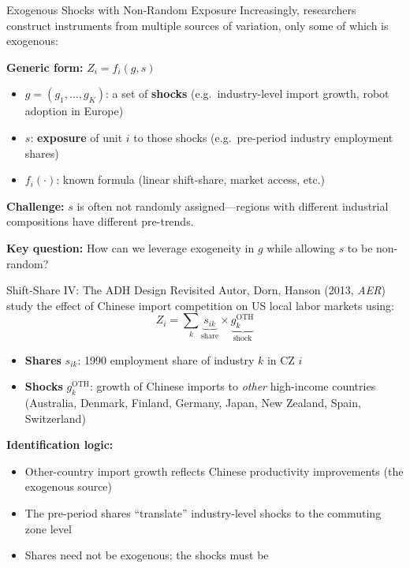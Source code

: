 \documentclass{beamer}
\begin{document}
\begin{frame}{Exogenous Shocks with Non-Random Exposure}
Increasingly, researchers construct instruments from multiple sources of
variation, only some of which is exogenous:

\medskip
\textbf{Generic form:} $Z_i = f_i(g,s)$
\begin{itemize}
  \item $g=(g_1,\ldots,g_K)$: a set of \textbf{shocks} (e.g.\ industry-level
        import growth, robot adoption in Europe)
  \item $s$: \textbf{exposure} of unit $i$ to those shocks
        (e.g.\ pre-period industry employment shares)
  \item $f_i(\cdot)$: known formula (linear shift-share, market access, etc.)
\end{itemize}

\medskip
\textbf{Challenge:} $s$ is often not randomly assigned---regions with
different industrial compositions have different pre-trends.

\medskip
\textbf{Key question:} How can we leverage exogeneity in $g$ while
allowing $s$ to be non-random?
\end{frame}

\begin{frame}{Shift-Share IV: The ADH Design Revisited}
Autor, Dorn, Hanson (2013, \emph{AER}) study the effect of Chinese import
competition on US local labor markets using:
\[
Z_i = \sum_k \underbrace{s_{ik}}_{\text{share}} \times
             \underbrace{g_k^{\text{OTH}}}_{\text{shock}}
\]
\begin{itemize}
  \item \textbf{Shares} $s_{ik}$: 1990 employment share of industry $k$ in CZ $i$
  \item \textbf{Shocks} $g_k^{\text{OTH}}$: growth of Chinese imports to
        \emph{other} high-income countries (Australia, Denmark, Finland,
        Germany, Japan, New Zealand, Spain, Switzerland)
\end{itemize}

\medskip
\textbf{Identification logic:}
\begin{itemize}
  \item Other-country import growth reflects Chinese productivity improvements
        (the exogenous source)
  \item The pre-period shares ``translate'' industry-level shocks to the
        commuting zone level
  \item Shares need not be exogenous; the shocks must be
\end{itemize}
\end{frame}
\end{document}

